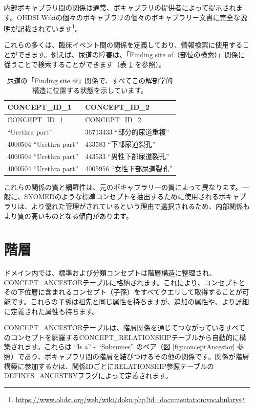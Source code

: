 \documentclass[
  11pt]{book}
\theoremstyle{definition}
\theoremstyle{definition}
\theoremstyle{definition}
\theoremstyle{definition}
\theoremstyle{remark}
\begin{document}
内部ボキャブラリ間の関係は通常、ボキャブラリの提供者によって提示されます。OHDSI Wikiの個々のボキャブラリの個々のボキャブラリー文書に完全な説明が記載されています\footnote{\url{https://www.ohdsi.org/web/wiki/doku.php?id=documentation:vocabulary}}。

これらの多くは、臨床イベント間の関係を定義しており、情報検索に使用することができます。例えば、尿道の障害は、「Finding site of（部位の検索）」関係に従うことで検索することができます（表 \ref{tab:findingSite} を参照）。

\begin{longtable}[]{@{}ll@{}}
\caption{\label{tab:findingSite} 尿道の「Finding site of」関係で、すべてこの解剖学的構造に位置する状態を示しています。}\tabularnewline
\toprule\noalign{}
CONCEPT\_ID\_1 & CONCEPT\_ID\_2 \\
\midrule\noalign{}
\endfirsthead
\toprule\noalign{}
CONCEPT\_ID\_1 & CONCEPT\_ID\_2 \\
\midrule\noalign{}
\endhead
\bottomrule\noalign{}
\endlastfoot
4000504 ``Urethra part'' & 36713433 ``部分的尿道重複'' \\
4000504 ``Urethra part'' & 433583 ``下部尿道裂孔'' \\
4000504 ``Urethra part'' & 443533 ``男性下部尿道裂孔'' \\
4000504 ``Urethra part'' & 4005956 ``女性下部尿道裂孔'' \\
\end{longtable}

これらの関係の質と網羅性は、元のボキャブラリーの質によって異なります。一般に、SNOMEDのような標準コンセプトを抽出するために使用されるボキャブラリは、より優れた管理がされているという理由で選択されるため、内部関係もより質の高いものとなる傾向があります。

\section{階層}\label{conceptAncestor}

ドメイン内では、標準および分類コンセプトは階層構造に整理され、CONCEPT\_ANCESTORテーブルに格納されます。これにより、コンセプトとその下位層に含まれるコンセプト（子孫）をすべてクエリして取得することが可能です。これらの子孫は祖先と同じ属性を持ちますが、追加の属性や、より詳細に定義された属性も持ちます。

CONCEPT\_ANCESTORテーブルは、階層関係を通じてつながっているすべてのコンセプトを網羅するCONCEPT\_RELATIONSHIPテーブルから自動的に構築されます。これらは ``Is a'' - ``Subsumes'' のペア（図 \ref{fig:conceptAncestor} 参照）であり、ボキャブラリ間の階層を結びつけるその他の関係です。関係が階層構築に参加するかは、関係IDごとにRELATIONSHIP参照テーブルのDEFINES\_ANCESTRYフラグによって定義されます。
\end{document}
